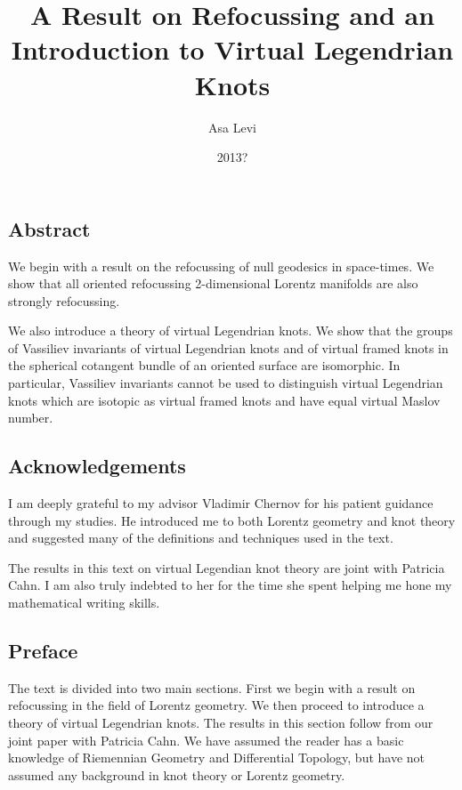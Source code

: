 \documentclass[copyright, final]{dcthesis}
\title{A Result on Refocussing and an Introduction to Virtual Legendrian Knots}
\author{Asa Levi}
\date{2013?}
\numberwithin{equation}{section}
\theoremstyle{plain}
\theoremstyle{definition}
\theoremstyle{definition}
\theoremstyle{remark}
\begin{document}
\frontmatter

\maketitle

\chapter*{}
\section*{Abstract}
We begin with a result on the refocussing of null geodesics in space-times.  We show that all oriented refocussing 2-dimensional Lorentz manifolds are also strongly refocussing.

We also introduce a theory of virtual Legendrian knots.  We show that the groups of Vassiliev invariants of virtual Legendrian knots and of virtual framed knots in the spherical cotangent bundle of an oriented surface are isomorphic.  In particular, Vassiliev invariants cannot be used to distinguish virtual Legendrian knots which are isotopic as virtual framed knots and have equal virtual Maslov number.

\newpage
\vspace{1 in}
\section*{Acknowledgements}
I am deeply grateful to my advisor Vladimir Chernov for his patient guidance through my studies.  He introduced me to both Lorentz geometry and knot theory and suggested many of the definitions and techniques used in the text.

The results in this text on virtual Legendian knot theory are joint with Patricia Cahn.  I am also truly indebted to her for the time she spent helping me hone my mathematical writing skills.

\section*{Preface}
The text is divided into two main sections.  First we begin with a result on refocussing in the field of Lorentz geometry.  We then proceed to introduce a theory of virtual Legendrian knots.  The results in this section follow from our joint paper with Patricia Cahn.  We have assumed the reader has a basic knowledge of Riemennian Geometry and Differential Topology, but have not assumed any background in knot theory or Lorentz geometry.
\end{document}
